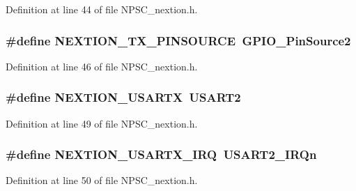 Definition at line 44 of file N\+P\+S\+C\+\_\+nextion.\+h.

\subsubsection[{\texorpdfstring{N\+E\+X\+T\+I\+O\+N\+\_\+\+T\+X\+\_\+\+P\+I\+N\+S\+O\+U\+R\+CE}{NEXTION_TX_PINSOURCE}}]{\setlength{\rightskip}{0pt plus 5cm}\#define N\+E\+X\+T\+I\+O\+N\+\_\+\+T\+X\+\_\+\+P\+I\+N\+S\+O\+U\+R\+CE~G\+P\+I\+O\+\_\+\+Pin\+Source2}\hypertarget{group__nextion___constants_gafefb806155aed3ab1f0d24fb6354013d}{}\label{group__nextion___constants_gafefb806155aed3ab1f0d24fb6354013d}


Definition at line 46 of file N\+P\+S\+C\+\_\+nextion.\+h.

\subsubsection[{\texorpdfstring{N\+E\+X\+T\+I\+O\+N\+\_\+\+U\+S\+A\+R\+TX}{NEXTION_USARTX}}]{\setlength{\rightskip}{0pt plus 5cm}\#define N\+E\+X\+T\+I\+O\+N\+\_\+\+U\+S\+A\+R\+TX~U\+S\+A\+R\+T2}\hypertarget{group__nextion___constants_gad110200ed1c63345918573270b4666ee}{}\label{group__nextion___constants_gad110200ed1c63345918573270b4666ee}


Definition at line 49 of file N\+P\+S\+C\+\_\+nextion.\+h.

\subsubsection[{\texorpdfstring{N\+E\+X\+T\+I\+O\+N\+\_\+\+U\+S\+A\+R\+T\+X\+\_\+\+I\+RQ}{NEXTION_USARTX_IRQ}}]{\setlength{\rightskip}{0pt plus 5cm}\#define N\+E\+X\+T\+I\+O\+N\+\_\+\+U\+S\+A\+R\+T\+X\+\_\+\+I\+RQ~U\+S\+A\+R\+T2\+\_\+\+I\+R\+Qn}\hypertarget{group__nextion___constants_ga781191cedaf0e3bbbe8e3a37d54a7d2c}{}\label{group__nextion___constants_ga781191cedaf0e3bbbe8e3a37d54a7d2c}


Definition at line 50 of file N\+P\+S\+C\+\_\+nextion.\+h.

